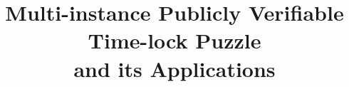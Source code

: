 \documentclass[orivec]{llncs}
\begin{document}
  \setlength\abovedisplayskip{0pt}
  \setlength\belowdisplayskip{0pt}


\newenvironment{packed_item}{
\begin{itemize}
	\setlength{\topsep}{0pt}
	\setlength{\partopsep}{0pt}
  \setlength{\itemsep}{0pt}
  \setlength{\parskip}{0pt}
  \setlength{\parsep}{0pt}
}{\end{itemize}}

\newenvironment{packed_enum}{
\begin{enumerate}
	\setlength{\topsep}{0pt}
	\setlength{\partopsep}{0pt}
  \setlength{\itemsep}{0pt}
  \setlength{\parskip}{0pt}
  \setlength{\parsep}{0pt}
}{\end{enumerate}}





\title{Multi-instance Publicly Verifiable Time-lock Puzzle\\ and its Applications}
%
%
\author{}
\institute{}


\maketitle              %
%
\end{document}
